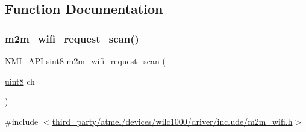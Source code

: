 \subsection{Function Documentation}
\mbox{\label{group__WifiRequestScanFn_ga499dfa24a19c2e84776aeabedf897135}} 
\subsubsection{\texorpdfstring{m2m\+\_\+wifi\+\_\+request\+\_\+scan()}{m2m\_wifi\_request\_scan()}}
{\footnotesize\ttfamily \hyperlink{group__BSPDefine_gaecc0323d771e41ef81a76b5f12783e22}{N\+M\+I\+\_\+\+A\+PI} \hyperlink{group__DataT_gae35f10ffd0ac8dd2bc3e794da9bdfbc7}{sint8} m2m\+\_\+wifi\+\_\+request\+\_\+scan (\begin{DoxyParamCaption}\item[{\hyperlink{group__DataT_ga4df709a77647e870bbf1d955b8edc9a6}{uint8}}]{ch }\end{DoxyParamCaption})}



{\ttfamily \#include $<$\hyperlink{m2m__wifi_8h}{third\+\_\+party/atmel/devices/wilc1000/driver/include/m2m\+\_\+wifi.\+h}$>$}


